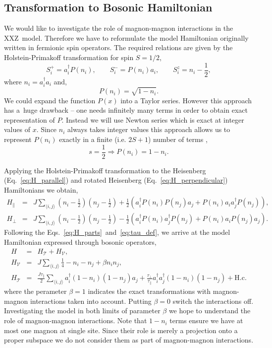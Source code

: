 \documentclass[12pt, a4paper]{article}
\newcommand{\mean}[1]{\langle#1\rangle}
\begin{document}
\subsection{Transformation to Bosonic Hamiltonian}
We would like to investigate the role of magnon-magnon interactions in the XXZ~model. Therefore we have to reformulate the model Hamiltonian originally written in fermionic spin operators. The required relations are given by the Holstein-Primakoff transformation for spin $S = 1/2$,
\begin{equation}
	S_i^+ = a_i^\dagger P(n_i), \quad\quad
	S_i^- = P(n_i) a_i, \quad\quad
	S_i^z = n_i - \frac{1}{2},
\end{equation}
where $n_i = a_i^\dagger a_i$ and,
\begin{equation}
	P(n_i) = \sqrt{1 - n_i}.	
\end{equation}
We could expand the function $P(x)$ into a Taylor series. However this approach has a~huge drawback -- one needs infinitely many terms in order to obtain exact representation of $P$. Instead we will use Newton series which is exact at integer values of $x$. Since $n_i$ always takes integer values this approach allows us to represent $P(n_i)$ exactly in a finite (i.e. $2S+1$) number of terms \cite{knig2020newton}, 
\begin{equation}
	s = \frac{1}{2} \Rightarrow P(n_i) = 1 - n_i.
\end{equation}

Applying the Holstein-Primakoff transformation to the Heisenberg (Eq.~\ref{eq:H_parallel}) and rotated Heisenberg (Eq.~\ref{eq:H_perpendicular}) Hamiltonians we obtain,
\begin{eqnarray}
	H_{\parallel} &=& J\sum_{\mean{i,j}} \left(n_i - \frac{1}{2}\right) \left(n_j - \frac{1}{2}\right) + \frac{1}{2}\left(a_i^\dagger P(n_i) P(n_j) a_j + P(n_i) a_i a_j^\dagger P(n_j)\right), \\
	H_{\perp} &=& J\sum_{\mean{i,j}} \left(n_i - \frac{1}{2}\right) \left(n_j - \frac{1}{2}\right) - \frac{1}{2}\left(a_i^\dagger P(n_i) a_j^\dagger P(n_j) + P(n_i) a_i P(n_j) a_j\right).
\end{eqnarray}
Following the Eqs.~\ref{eq:H_parts}~and~\ref{eq:tau_def}, we arrive at the model Hamiltonian expressed through bosonic operators,
\begin{eqnarray}\label{eq:H_bosonic}
	H &=& H_{\mathcal{T}} + H_{\mathcal{V}}, \\
	H_{\mathcal{V}} &=& J\sum_{\mean{i,j}} \frac{1}{4} - n_i - n_j + \beta n_i n_j, \\
	H_{\mathcal{T}} &=& \frac{J\tau_{\parallel}}{2} \sum_{\mean{i,j}} a_i^\dagger (1-n_i)(1-n_j)a_j + \frac{\tau_{\perp}}{\tau_{\parallel}} a_i^\dagger a_j^\dagger (1-n_i) (1-n_j) + \text{H.c.}
\end{eqnarray}
where the perameter $\beta = 1$ indicates the exact transformations with magnon-magnon interactions taken into account. Putting $\beta = 0$ switch the interactions off. Investigating the model in both limits of parameter $\beta$ we hope to understand the role of magnon-magnon interactions. Note that $1-n_i$ terms ensure we have at most one magnon at single site. Since their role is merely a projection onto a proper subspace we do not consider them as part of magnon-magnon interactions. 
\end{document}
